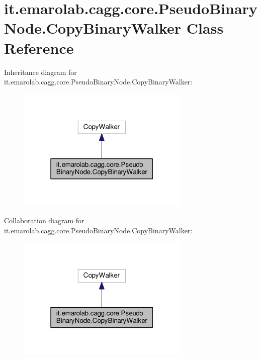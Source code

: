 \hypertarget{classit_1_1emarolab_1_1cagg_1_1core_1_1PseudoBinaryNode_1_1CopyBinaryWalker}{\section{it.\-emarolab.\-cagg.\-core.\-Pseudo\-Binary\-Node.\-Copy\-Binary\-Walker Class Reference}
\label{classit_1_1emarolab_1_1cagg_1_1core_1_1PseudoBinaryNode_1_1CopyBinaryWalker}
}


Inheritance diagram for it.\-emarolab.\-cagg.\-core.\-Pseudo\-Binary\-Node.\-Copy\-Binary\-Walker\-:\nopagebreak
\begin{figure}[H]
\begin{center}
\leavevmode
\includegraphics[width=232pt]{classit_1_1emarolab_1_1cagg_1_1core_1_1PseudoBinaryNode_1_1CopyBinaryWalker__inherit__graph}
\end{center}
\end{figure}


Collaboration diagram for it.\-emarolab.\-cagg.\-core.\-Pseudo\-Binary\-Node.\-Copy\-Binary\-Walker\-:\nopagebreak
\begin{figure}[H]
\begin{center}
\leavevmode
\includegraphics[width=232pt]{classit_1_1emarolab_1_1cagg_1_1core_1_1PseudoBinaryNode_1_1CopyBinaryWalker__coll__graph}
\end{center}
\end{figure}
